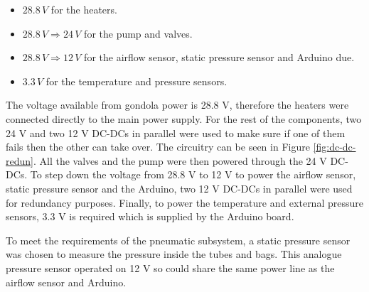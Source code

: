 \begin{itemize}

    \item $28.8 \, V$ for the heaters.  
    
    \item $28.8 \, V \Longrightarrow 24 \, V$ for the pump and valves.
    
    \item $28.8 \, V \Longrightarrow 12 \, V$ for the airflow sensor, static pressure sensor and Arduino due.
    
    \item $3.3 \, V$ for the temperature and pressure sensors. 
    
\end{itemize}

The voltage available from gondola power is 28.8 V, therefore the heaters were connected directly to the main power supply. For the rest of the components, two 24 V and two 12 V DC-DCs in parallel were used to make sure if one of them fails then the other can take over. The circuitry can be seen in Figure \ref{fig:dc-dc-redun}. All the valves and the pump were then powered through the 24 V DC-DCs. To step down the voltage from 28.8 V to 12 V to power the airflow sensor, static pressure sensor and the Arduino, two 12 V DC-DCs in parallel were used for redundancy purposes. Finally, to power the temperature and external pressure sensors, 3.3 V is required which is supplied by the Arduino board. 

To meet the requirements of the pneumatic subsystem, a static pressure sensor was chosen to measure the pressure inside the tubes and bags. This analogue pressure sensor operated on 12 V so could share the same power line as the airflow sensor and Arduino.


